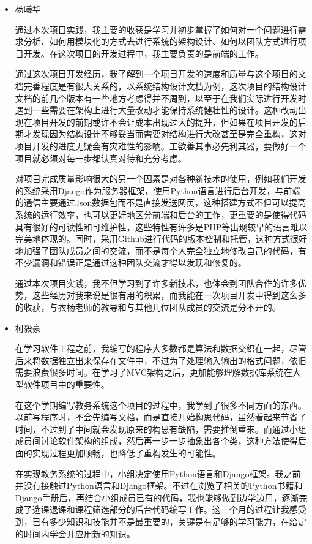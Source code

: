 \begin{itemize}
  \item 杨曦华
  
  \CJKindent 通过本次项目实践，我主要的收获是学习并初步掌握了如何对一个问题进行需求分析、如何用模块化的方式去进行系统的架构设计、如何以团队方式进行项目开发。在这次项目的开发过程中，我主要负责的是前端的工作。
  
  \CJKindent 通过这次项目开发经历，我了解到一个项目开发的速度和质量与这个项目的文档完善程度是有很大关系的，以系统结构设计文档为例，这次项目的结构设计文档的前几个版本有一些地方考虑得并不周到，以至于在我们实际进行开发时遇到一些需要在架构上进行大量改动才能保持系统健壮性的设计。这种改动出现在项目开发的前期或许不会让成本出现过大的提升，但如果在项目开发的后期才发现因为结构设计不够妥当而需要对结构进行大改甚至是完全重构，这对项目开发的进度无疑会有灾难性的影响。工欲善其事必先利其器，要做好一个项目就必须对每一步都认真对待和充分考虑。
  
  \CJKindent 对项目完成质量影响很大的另一个因素是对各种新技术的使用，例如我们开发的系统采用Django作为服务器框架，使用Python语言进行后台开发，与前端的通信主要通过Json数据包而不是直接发送网页，这种搭建方式不但可以提高系统的运行效率，也可以更好地区分前端和后台的工作，更重要的是使得代码具有很好的可读性和可维护性，这些特性有许多是PHP等出现较早的语言难以完美地体现的。同时，采用Github进行代码的版本控制和托管，这种方式很好地加强了团队成员之间的交流，而不是每个人完全独立地修改自己的代码，有不少漏洞和错误正是通过这种团队交流才得以发现和修复的。
  
  \CJKindent 通过本次项目实践，我不但学习到了许多新技术，也体会到团队合作的许多优势，这些经历对我来说是很有用的积累，而我能在一次项目开发中得到这么多的收获，与衣杨老师的教导和与其他几位团队成员的交流是分不开的。
  
  \item 柯毅豪
  
  \CJKindent 在学习软件工程之前，我编写的程序大多数都是算法和数据交织在一起，尽管后来将数据独立出来保存在文件中，不过为了处理输入输出的格式问题，依旧需要浪费很多时间。在学习了MVC架构之后，更加能够理解数据库系统在大型软件项目中的重要性。
  
  \CJKindent 在这个学期编写教务系统这个项目的过程中，我学到了很多不同方面的东西。以前写程序时，不会先编写文档，而是直接开始构思代码，虽然看起来节省了时间，不过到了中间就会发现原来的构思有缺陷，需要推倒重来。而通过小组成员间讨论软件架构的组成，然后再一步一步抽象出各个类，这种方法使得后面的实现过程更加顺畅，也降低了重构发生的可能性。
  
  \CJKindent 在实现教务系统的过程中，小组决定使用Python语言和Django框架。我之前并没有接触过Python语言和Django框架。不过在浏览了相关的Python书籍和Django手册后，再结合小组成员已有的代码，我也能够做到边学边用，逐渐完成了选课退课和课程筛选部分的后台代码编写工作。这三个月的过程让我感受到，已有多少知识和技能并不是最重要的，关键是有足够的学习能力，在给定的时间内学会并应用新的知识。
  

\end{itemize}
